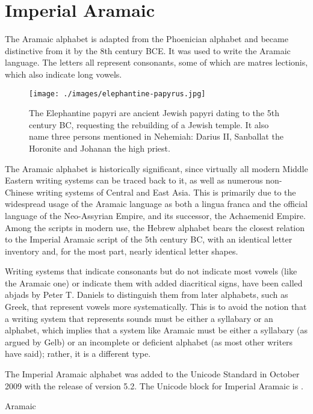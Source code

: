 \section{Imperial Aramaic}
\label{s:imperialaramaic}

\newfontfamily{}
The Aramaic alphabet is adapted from the Phoenician alphabet and became distinctive from it by the 8th century BCE. It was used to write the Aramaic language. The letters all represent consonants, some of which are matres lectionis, which also indicate long vowels.
\medskip

\begin{figure}[htbp]
\centering
\texttt{[image: ./images/elephantine-papyrus.jpg]}

\caption{The Elephantine papyri are ancient Jewish papyri dating to the 5th century BC, requesting the rebuilding of a Jewish temple. It also name three persons mentioned in Nehemiah: Darius II, Sanballat the Horonite and Johanan the high priest.}

\end{figure}


The Aramaic alphabet is historically significant, since virtually all modern Middle Eastern writing systems can be traced back to it, as well as numerous non-Chinese writing systems of Central and East Asia. This is primarily due to the widespread usage of the Aramaic language as both a lingua franca and the official language of the Neo-Assyrian Empire, and its successor, the Achaemenid Empire. Among the scripts in modern use, the Hebrew alphabet bears the closest relation to the Imperial Aramaic script of the 5th century BC, with an identical letter inventory and, for the most part, nearly identical letter shapes.

Writing systems that indicate consonants but do not indicate most vowels (like the Aramaic one) or indicate them with added diacritical signs, have been called abjads by Peter T. Daniels to distinguish them from later alphabets, such as Greek, that represent vowels more systematically. This is to avoid the notion that a writing system that represents sounds must be either a syllabary or an alphabet, which implies that a system like Aramaic must be either a syllabary (as argued by Gelb) or an incomplete or deficient alphabet (as most other writers have said); rather, it is a different type.

The Imperial Aramaic alphabet was added to the Unicode Standard in October 2009 with the release of version 5.2.
The Unicode block for Imperial Aramaic is .

\begin{scriptexample}[]{Aramaic}
\end{scriptexample}




